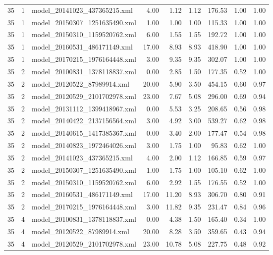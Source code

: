 \begin{table}[ht]
\begin{tabular}{rrlrrrrrr}
   35 &   1 & model\_20141023\_437365215.xml & 4.00 & 1.12 & 1.12 & 176.53 & 1.00 & 1.00 \\ 
   35 &   1 & model\_20150307\_1251635490.xml & 1.00 & 1.00 & 1.00 & 115.33 & 1.00 & 1.00 \\ 
   35 &   1 & model\_20150310\_1159520762.xml & 6.00 & 1.55 & 1.55 & 192.72 & 1.00 & 1.00 \\ 
   35 &   1 & model\_20160531\_486171149.xml & 17.00 & 8.93 & 8.93 & 418.90 & 1.00 & 1.00 \\ 
   35 &   1 & model\_20170215\_1976164448.xml & 3.00 & 9.35 & 9.35 & 302.07 & 1.00 & 1.00 \\ 
   35 &   2 & model\_20100831\_1378118837.xml & 0.00 & 2.85 & 1.50 & 177.35 & 0.52 & 1.00 \\ 
   35 &   2 & model\_20120522\_87989914.xml & 20.00 & 5.90 & 3.50 & 454.15 & 0.60 & 0.97 \\ 
   35 &   2 & model\_20120529\_2101702978.xml & 23.00 & 7.67 & 5.08 & 296.00 & 0.69 & 0.94 \\ 
   35 &   2 & model\_20131112\_1399418967.xml & 0.00 & 5.53 & 3.25 & 208.65 & 0.56 & 0.98 \\ 
   35 &   2 & model\_20140422\_2137156564.xml & 3.00 & 4.92 & 3.00 & 539.27 & 0.62 & 0.98 \\ 
   35 &   2 & model\_20140615\_1417385367.xml & 0.00 & 3.40 & 2.00 & 177.47 & 0.54 & 0.98 \\ 
   35 &   2 & model\_20140823\_1972464026.xml & 3.00 & 1.75 & 1.00 & 95.83 & 0.62 & 1.00 \\ 
   35 &   2 & model\_20141023\_437365215.xml & 4.00 & 2.00 & 1.12 & 166.85 & 0.59 & 0.97 \\ 
   35 &   2 & model\_20150307\_1251635490.xml & 1.00 & 1.75 & 1.00 & 105.10 & 0.62 & 1.00 \\ 
   35 &   2 & model\_20150310\_1159520762.xml & 6.00 & 2.92 & 1.55 & 176.55 & 0.52 & 1.00 \\ 
   35 &   2 & model\_20160531\_486171149.xml & 17.00 & 11.20 & 8.93 & 306.70 & 0.80 & 0.91 \\ 
   35 &   2 & model\_20170215\_1976164448.xml & 3.00 & 11.82 & 9.35 & 231.47 & 0.84 & 0.96 \\ 
   35 &   4 & model\_20100831\_1378118837.xml & 0.00 & 4.38 & 1.50 & 165.40 & 0.34 & 1.00 \\ 
   35 &   4 & model\_20120522\_87989914.xml & 20.00 & 8.28 & 3.50 & 359.65 & 0.43 & 0.94 \\ 
   35 &   4 & model\_20120529\_2101702978.xml & 23.00 & 10.78 & 5.08 & 227.75 & 0.48 & 0.92 \\ 

\end{tabular}
\end{table}
